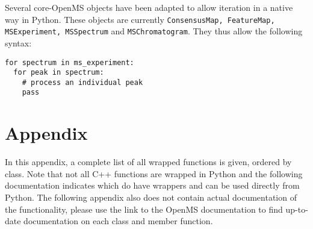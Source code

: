 \documentclass[10pt]{article}
\begin{document}
Several core-OpenMS objects have been adapted to allow iteration in a native
way in Python. These objects are currently \texttt{ConsensusMap, FeatureMap,
MSExperiment, MSSpectrum} and \texttt{MSChromatogram}. They thus allow the
following syntax:

\begin{verbatim}
for spectrum in ms_experiment:
  for peak in spectrum:
    # process an individual peak
    pass
\end{verbatim}

\section{Appendix}
In this appendix, a complete list of all wrapped functions is given, ordered
by class. Note that not all C++ functions are wrapped in Python and the
following documentation indicates which do have wrappers and can be used
directly from Python. The following appendix also does not contain actual
documentation of the functionality, please use the link to the OpenMS
documentation to find up-to-date documentation on each class and member
function.


\end{document}
